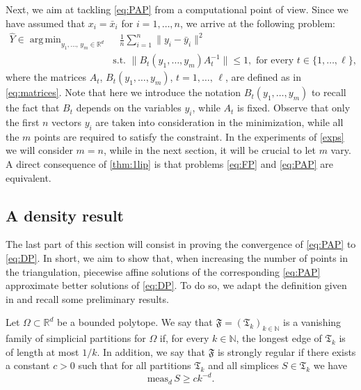\documentclass[onefignum,onetabnum]{siamonline250211}
\newcommand{\R}{\mathbb{R}}
\DeclareMathOperator*{\argmin}{arg\,min}
\begin{document}
Next, we aim at tackling \cref{eq:PAP} from a computational point of view. Since we have assumed that $x_i=\bar{x}_i$ for $i=1,\dots,n$, we arrive at the following problem: 
\begin{equation}\label{eq:FP}
\tag{FP}
\begin{aligned}
    \widehat{Y}\in\argmin_{y_1,\ldots, \, y_m\in\R^d} & \quad \frac{1}{n}\sum_{i=1}^n\|y_i-\bar{y}_i\|^2\\ 
    & \text{ s.t. } \|B_t(y_1,\ldots,y_m)A_t^{-1}\|\leq 1, \text{ for every } t\in\{1,\dots,\ell\},
\end{aligned}
\end{equation}
where  the matrices $A_t$, $B_t(y_1,\ldots,y_m)$, $t=1,\ldots, \, \ell$, are defined as in \cref{eq:matrices}. Note that here we introduce the notation $B_t(y_1,\ldots,y_m)$ to recall the fact that $B_t$ depends on the variables $y_i$, while $A_t$ is fixed. Observe that only the first $n$ vectors $y_i$ are taken into consideration in the minimization, while all the $m$ points are required to satisfy the constraint. In the experiments of \cref{exps} we will consider $m=n$, while in the next section, it will be crucial to let $m$ vary. A direct consequence of \cref{thm:1lip} is that problems \cref{eq:FP} and \cref{eq:PAP} are equivalent.

\subsection{A density result}\label{sec:density}
The last part of this section will consist in proving the convergence of \cref{eq:PAP} to \cref{eq:DP}. In short, we aim to show that, when increasing the number of points in the triangulation, piecewise affine solutions of the corresponding \cref{eq:PAP} approximate better solutions of \cref{eq:DP}. To do so, we adapt the definition given in \cite[Definition 2.2]{hannu2014} and recall some preliminary results. 
\begin{definition}\label{def:vanishing_family} Let $\Omega \subset \mathbb{R}^d$ be a bounded polytope. We say that $\mathfrak{F}=(\mathfrak{T}_k)_{k\in\mathbb{N}}$ is a vanishing family of simplicial partitions for $\Omega$ if, for every $k\in\mathbb{N}$, the longest edge of $\mathfrak{T}_k$ is of length at most $1/k$. In addition, we say that $\mathfrak{F}$ is strongly regular if there exists a constant $c>0$ such that for all partitions $\mathfrak{T}_k$ and all simplices $S\in \mathfrak{T}_k$ we have
$$
\mathrm{meas}_d\, S \geq c k^{-d}.
$$
\end{definition}
\end{document}
